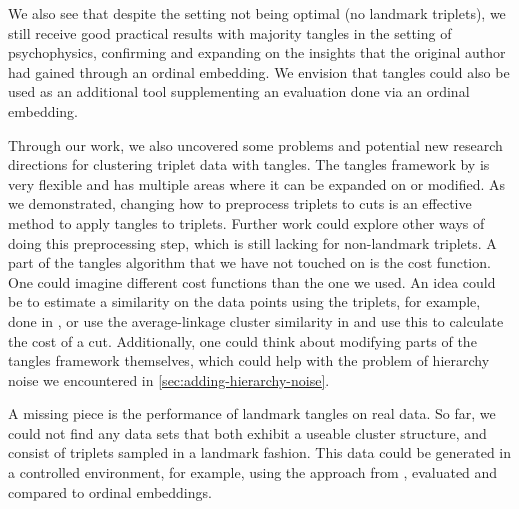 We also see that despite the setting not being optimal (no landmark triplets), we still receive good practical results with majority tangles in the setting of psychophysics, 
confirming and expanding on the insights that the original author had gained through an ordinal embedding. We envision that tangles could also be used as an additional tool supplementing an evaluation done via an ordinal embedding. 

Through our work, we also uncovered some problems and potential new research directions for clustering triplet data with tangles. 
The tangles framework by \cite{klepperClusteringTanglesAlgorithmic2021} is very flexible and has multiple areas where it can be expanded on or modified. 
As we demonstrated, changing how to preprocess triplets to cuts is an effective method to apply tangles to triplets. 
Further work could explore other ways of doing this preprocessing step, which is still lacking for non-landmark triplets. 
A part of the tangles algorithm that we have not touched on is the cost function. 
One could imagine different cost functions than the one we used. An idea could be to estimate a similarity on the data points using the triplets, for example, done in 
\cite{kleindessnerKernelFunctionsBased2017}, or use the average-linkage cluster similarity in \cite{ghoshdastidarFoundationsComparisonBasedHierarchical2019} and use this to calculate the cost 
of a cut.
Additionally, one could think about modifying parts of the tangles framework themselves, which could help with the problem of 
hierarchy noise we encountered in \autoref{sec:adding-hierarchy-noise}.

A missing piece is the performance of landmark tangles on real data. So far, we could not find any data sets that both exhibit a useable cluster structure, and consist of triplets
sampled in a landmark fashion. This data could be generated in a controlled environment, for example, using the approach from \cite{inesschonmannSimilarityJudgementsNatural2021}, 
evaluated and compared to ordinal embeddings. 
